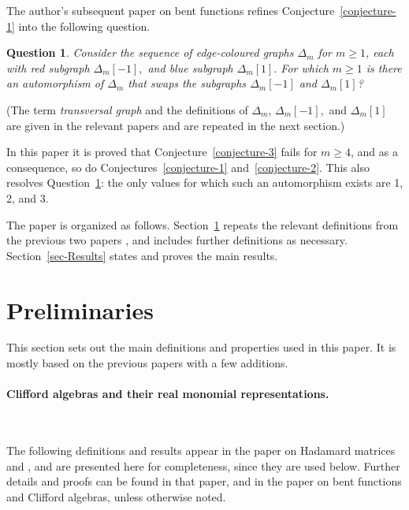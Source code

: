 \documentclass[12pt,a4paper]{article}
\newtheorem{Question}{Question}
\begin{document}
The author's subsequent paper on bent functions \cite{Leo15Bent} 
refines Conjecture~\ref{conjecture-1} into the following question.
\begin{Question}
\label{Question-1}
Consider the sequence of edge-coloured graphs $\varDelta_m$ for $m \geqslant 1$,
each with red subgraph $\varDelta_m[-1],$ and blue subgraph $\varDelta_m[1].$
For which $m \geqslant 1$ is there an automorphism of $\varDelta_m$ 
that swaps the subgraphs $\varDelta_m[-1]$ and $\varDelta_m[1]$?
\end{Question}
 
(The term \emph{transversal graph} and the definitions of $\varDelta_m$, $\varDelta_m[-1],$ and $\varDelta_m[1]$ 
are given in the relevant papers and are repeated in the next section.)

In this paper it is proved that Conjecture~\ref{conjecture-3} fails for $m \geqslant 4$, and as a consequence, 
so do Conjectures~\ref{conjecture-1} and~\ref{conjecture-2}.
This also resolves Question~\ref{Question-1}: the only values for which such an automorphism exists are 1, 2, and 3.

The paper is organized as follows.
Section~\ref{sec-Preliminaries} repeats the relevant definitions from the previous two papers \cite{Leo14Constructions,Leo15Bent},
and includes further definitions as necessary.
Section~\ref{sec-Results} states and proves the main results.

\section{Preliminaries}
\label{sec-Preliminaries}
This section sets out the main definitions and properties used in this paper.
It is mostly based on the previous papers \cite{Leo14Constructions, Leo15Bent}
with a few additions.

\paragraph*{Clifford algebras and their real monomial representations.}
\label{sec-Clifford}

~

The following definitions and results appear in the paper on Hada\-mard matrices and  \cite{Leo14Constructions},
and are presented here for completeness, since they are used below. 
Further details and proofs can be found in that paper, and in the paper on bent functions and Clifford algebras,
unless otherwise noted.
\end{document}
